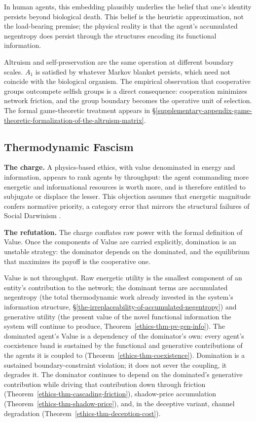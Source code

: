 \documentclass[11pt]{article}
\theoremstyle{plain}
\theoremstyle{definition}
\theoremstyle{remark}
\let\origsubsection\subsection
\renewcommand{\subsection}{\needspace{7\baselineskip}\origsubsection}
\begin{document}
In human agents, this embedding plausibly underlies the belief that
one's identity persists beyond biological death. This belief is the
heuristic approximation, not the load-bearing premise; the physical
reality is that the agent's accumulated negentropy does persist through
the structures encoding its functional information.

Altruism and self-preservation are the same operation at different
boundary scales. \(A_1\) is satisfied by whatever Markov blanket
persists, which need not coincide with the biological organism. The
empirical observation that cooperative groups outcompete selfish groups
\citep{WilsonWilson2007, SoberWilson1998} is a direct consequence:
cooperation minimizes network friction, and the group boundary becomes
the operative unit of selection. The formal game-theoretic treatment
appears in
§\ref{supplementary-appendix-game-theoretic-formalization-of-the-altruism-matrix}.

\subsection{Thermodynamic Fascism}\label{thermodynamic-fascism}

\textbf{The charge.} A physics-based ethics, with value denominated in
energy and information, appears to rank agents by throughput: the agent
commanding more energetic and informational resources is worth more, and
is therefore entitled to subjugate or displace the lesser. This
objection assumes that energetic magnitude confers normative priority, a
category error that mirrors the structural failures of Social Darwinism
\citep{Spencer1864, Hofstadter1944}.

\textbf{The refutation.} The charge conflates raw power with the formal
definition of Value. Once the components of Value are carried
explicitly, domination is an unstable strategy: the dominator depends on
the dominated, and the equilibrium that maximizes its payoff is the
cooperative one.

Value is not throughput. Raw energetic utility is the smallest component
of an entity's contribution to the network; the dominant terms are
accumulated negentropy (the total thermodynamic work already invested in
the system's information structure,
§\ref{the-irreplaceability-of-accumulated-negentropy}) and generative
utility (the present value of the novel functional information the
system will continue to produce, Theorem~\ref{ethics-thm-pv-gen-info}).
The dominated agent's Value is a dependency of the dominator's own:
every agent's coexistence band is sustained by the functional and
generative contributions of the agents it is coupled to
(Theorem~\ref{ethics-thm-coexistence}). Domination is a sustained
boundary-constraint violation; it does not sever the coupling, it
degrades it. The dominator continues to depend on the dominated's
generative contribution while driving that contribution down through
friction (Theorem~\ref{ethics-thm-cascading-friction}), shadow-price
accumulation (Theorem~\ref{ethics-thm-shadow-price}), and, in the
deceptive variant, channel degradation
(Theorem~\ref{ethics-thm-deception-cost}).
\end{document}
